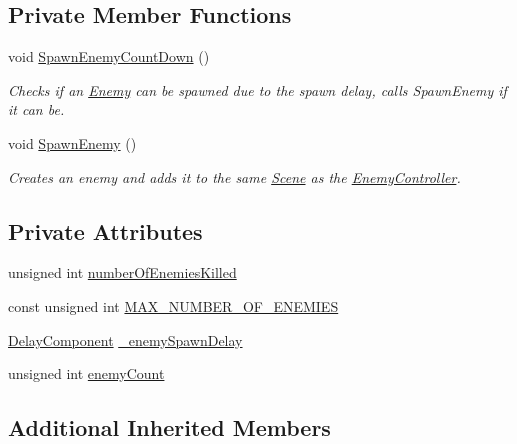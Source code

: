 \subsection*{Private Member Functions}
\begin{DoxyCompactItemize}
\item 
\mbox{\label{class_enemy_controller_a84eabc12a38617b5ff05c6e896e97531}} 
void \hyperlink{class_enemy_controller_a84eabc12a38617b5ff05c6e896e97531}{Spawn\+Enemy\+Count\+Down} ()
\begin{DoxyCompactList}\small\item\em Checks if an \hyperlink{class_enemy}{Enemy} can be spawned due to the spawn delay, calls Spawn\+Enemy if it can be. \end{DoxyCompactList}\item 
\mbox{\label{class_enemy_controller_ab5298e79a0bf598ed8684efb8a6a3927}} 
void \hyperlink{class_enemy_controller_ab5298e79a0bf598ed8684efb8a6a3927}{Spawn\+Enemy} ()
\begin{DoxyCompactList}\small\item\em Creates an enemy and adds it to the same \hyperlink{class_scene}{Scene} as the \hyperlink{class_enemy_controller}{Enemy\+Controller}. \end{DoxyCompactList}\end{DoxyCompactItemize}
\subsection*{Private Attributes}
\begin{DoxyCompactItemize}
\item 
unsigned int \hyperlink{class_enemy_controller_a2b2fdb5b40b75f719838da0386861da5}{number\+Of\+Enemies\+Killed}
\item 
const unsigned int \hyperlink{class_enemy_controller_aca04264b909526dadc67a41f8c826aee}{M\+A\+X\+\_\+\+N\+U\+M\+B\+E\+R\+\_\+\+O\+F\+\_\+\+E\+N\+E\+M\+I\+ES}
\item 
\hyperlink{class_delay_component}{Delay\+Component} \hyperlink{class_enemy_controller_af6136b2e8750227e8adf729c9de5232b}{\+\_\+enemy\+Spawn\+Delay}
\item 
unsigned int \hyperlink{class_enemy_controller_a673e9320e737999189b943216f6d379b}{enemy\+Count}
\end{DoxyCompactItemize}
\subsection*{Additional Inherited Members}


